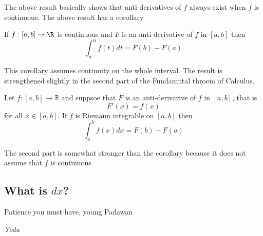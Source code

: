 	The above result basically shows that anti-derivatives of $f$ always exist when $f$ is continuous.	The above result has a corollary
	
	\begin{corollary}
		If $f : [a, b] \to \R$ is continuous and $F$ is an anti-derivative of $f$ in $[a, b]$ then $$\int_{a}^n f(t) dt = F(b) - F(a)$$
	\end{corollary}
	
	This corollary assumes continuity on the whole interval. The result is strengthened slightly in the second part of the Fundamntal throem of Calculus.
	
	\begin{theorem}
		Let $f : [a, b] \to \mathbb{R}$ and suppsoe that $F$ is an anti-derivarive of $f$ in $[a, b]$, that is $$F'(x) = f(x)$$ for all $x \in [a, b]$. If $f$ is Riemann integrable on $[a, b]$ then $$\int_{a}^bf(x) dx = F(b)-F(a)$$
	\end{theorem}
	
	The second part is somewhat stronger than the corollary because it does not assume that $f$ is continuous


	
	\subsection{What is $dx$?}
	\epigraph{Patience you must have, young Padawan}{\textit{Yoda}}
	